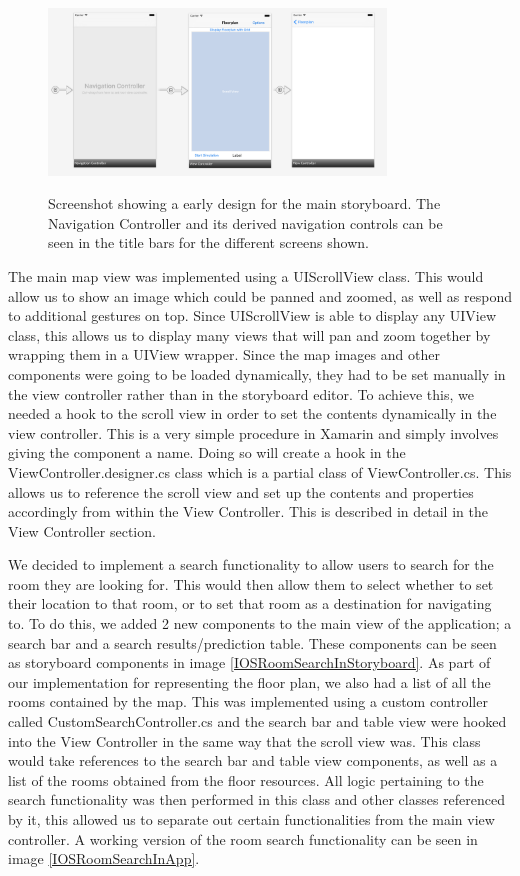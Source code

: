 \documentclass[12pt,a4paper]{report}
\begin{document}
\begin{figure}[]
\centering
\includegraphics[width=0.8\textwidth]{images-implementation/InitialStoryboard.png}
\label{initStoryboard}
\caption{Screenshot showing a early design for the main storyboard. The Navigation Controller and its derived navigation controls can be seen in the title bars for the different screens shown.}
\end{figure}

The main map view was implemented using a UIScrollView class. This would allow us to show an image which could be panned and zoomed, as well as respond to additional gestures on top. Since UIScrollView is able to display any UIView class, this allows us to display many views that will pan and zoom together by wrapping them in a UIView wrapper. Since the map images and other components were going to be loaded dynamically, they had to be set manually in the view controller rather than in the storyboard editor. To achieve this, we needed a hook to the scroll view in order to set the contents dynamically in the view controller. This is a very simple procedure in Xamarin and simply involves giving the component a name. Doing so will create a hook in the ViewController.designer.cs class which is a partial class of ViewController.cs. This allows us to reference the scroll view and set up the contents and properties accordingly from within the View Controller. This is described in detail in the View Controller section.

We decided to implement a search functionality to allow users to search for the room they are looking for. This would then allow them to select whether to set their location to that room, or to set that room as a destination for navigating to. To do this, we added 2 new components to the main view of the application; a search bar and a search results/prediction table. These components can be seen as storyboard components in image \ref{IOSRoomSearchInStoryboard}. As part of our implementation for representing the floor plan, we also had a list of all the rooms contained by the map. This was implemented using a custom controller called CustomSearchController.cs and the search bar and table view were hooked into the View Controller in the same way that the scroll view was. This class would take references to the search bar and table view components, as well as a list of the rooms obtained from the floor resources. All logic pertaining to the search functionality was then performed in this class and other classes referenced by it, this allowed us to separate out certain functionalities from the main view controller. A working version of the room search functionality can be seen in image \ref{IOSRoomSearchInApp}.
\end{document}
